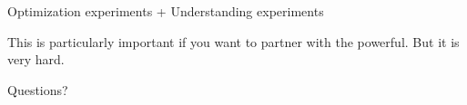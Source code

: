 \documentclass[aspectratio=169]{beamer}
\begin{document}
\begin{frame}

\Large{
\begin{center}
Optimization experiments + Understanding experiments
\end{center}
}

\pause
This is particularly important if you want to partner with the powerful.  But it is very hard.

\end{frame}
\begin{frame}

\Large{
\begin{center}
Questions?
\end{center}
}

\end{frame}
\end{document}
